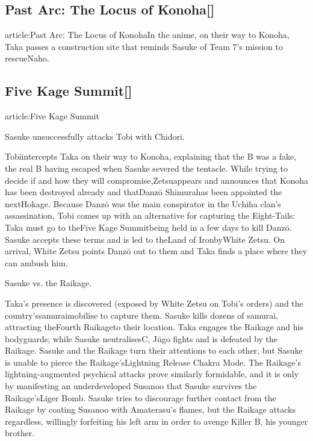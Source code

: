\documentclass[a4paper,12pt]{article}
\begin{document}
\subsection*{Past Arc: The Locus of Konoha[]}\n\nMain article:Past Arc: The Locus of KonohaIn the anime, on their way to Konoha, Taka passes a construction site that reminds Sasuke of Team 7's mission to rescueNaho.\\ \par \vspace{0.5cm}

\subsection*{Five Kage Summit[]}\n\nMain article:Five Kage Summit\\ \par \vspace{0.5cm}

Sasuke unsuccessfully attacks Tobi with Chidori.\\ \par \vspace{0.5cm}

Tobiintercepts Taka on their way to Konoha, explaining that the B was a fake, the real B having escaped when Sasuke severed the tentacle. While trying to decide if and how they will compromise,Zetsuappears and announces that Konoha has been destroyed already and thatDanzō Shimurahas been appointed the nextHokage. Because Danzō was the main conspirator in the Uchiha clan's assassination, Tobi comes up with an alternative for capturing the Eight-Tails: Taka must go to theFive Kage Summitbeing held in a few days to kill Danzō. Sasuke accepts these terms and is led to theLand of IronbyWhite Zetsu. On arrival, White Zetsu points Danzō out to them and Taka finds a place where they can ambush him.\\ \par \vspace{0.5cm}

Sasuke vs. the Raikage.\\ \par \vspace{0.5cm}

Taka's presence is discovered (exposed by White Zetsu on Tobi's orders) and the country'ssamuraimobilise to capture them. Sasuke kills dozens of samurai, attracting theFourth Raikageto their location. Taka engages the Raikage and his bodyguards; while Sasuke neutralisesC, Jūgo fights and is defeated by the Raikage. Sasuke and the Raikage turn their attentions to each other, but Sasuke is unable to pierce the Raikage'sLightning Release Chakra Mode. The Raikage's lightning-augmented psychical attacks prove similarly formidable, and it is only by manifesting an underdeveloped Susanoo that Sasuke survives the Raikage'sLiger Bomb. Sasuke tries to discourage further contact from the Raikage by coating Susanoo with Amaterasu's flames, but the Raikage attacks regardless, willingly forfeiting his left arm in order to avenge Killer B, his younger brother.\\ \par \vspace{0.5cm}
\end{document}

